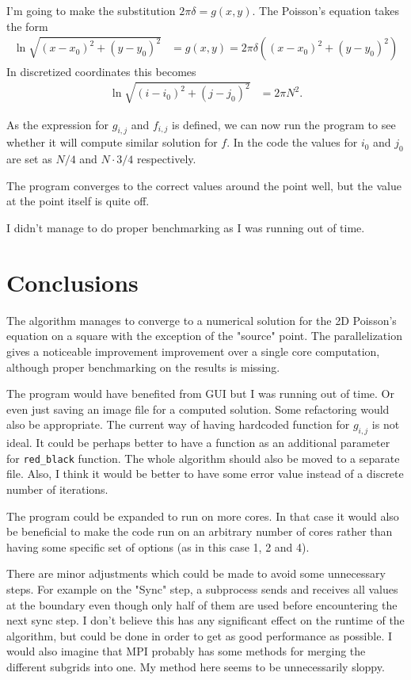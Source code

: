 \documentclass[12pt, letterpaper]{article}
\begin{document}
I'm going to make the substitution $2\pi \delta=g(x,y)$.
The Poisson's equation takes the form
\begin{align*}
  \ln\sqrt{(x-x_0)^2+(y-y_0)^2} &= g(x,y) = 2 \pi\delta((x-x_0)^2+(y-y_0)^2) 
\end{align*}
In discretized coordinates this becomes
\begin{align*}
  \ln\sqrt{(i-i_0)^2+(j-j_0)^2} &= 2 \pi N^2.
\end{align*}

As the expression for $g_{i,j}$ and $f_{i,j}$ is defined, we can now run the program to see whether it will compute similar solution for $f$.
In the code the values for $i_0$ and $j_0$ are set as $N/4$ and $N\cdot3/4$ respectively.

The program converges to the correct values around the point well, but the value at the point itself is quite off.

I didn't manage to do proper benchmarking as I was running out of time.

\section{Conclusions}
The algorithm manages to converge to a numerical solution for the 2D Poisson's equation on a square with the exception of the "source" point.
The parallelization gives a noticeable improvement improvement over a single core computation, although proper benchmarking on the results is missing.


The program would have benefited from GUI but I was running out of time.
Or even just saving an image file for a computed solution.
Some refactoring would also be appropriate.
The current way of having hardcoded function for $g_{i,j}$ is not ideal. 
It could be perhaps better to have a function as an additional parameter for \verb|red_black| function.
The whole algorithm should also be moved to a separate file.
Also, I think it would be better to have some error value instead of a discrete number of iterations.

The program could be expanded to run on more cores.
In that case it would also be beneficial to make the code run on an arbitrary number of cores rather than having some specific set of options (as in this case 1, 2 and 4).

There are minor adjustments which could be made to avoid some unnecessary steps.
For example on the "Sync" step, a subprocess sends and receives all values at the boundary even though only half of them are used before encountering the next sync step.
I don't believe this has any significant effect on the runtime of the algorithm, but could be done in order to get as good performance as possible.
I would also imagine that MPI probably has some methods for merging the different subgrids into one.
My method here seems to be unnecessarily sloppy.
\end{document}
